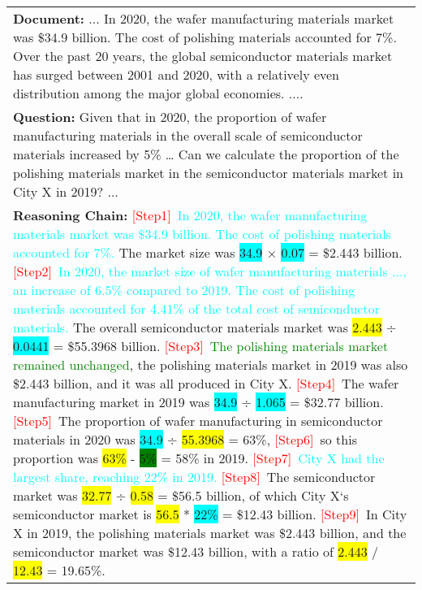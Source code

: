 \begin{table}[]
    \centering
    \begin{tabular}{p{7.5cm}}
    \toprule
    \textbf{Document:}
    \small ... In 2020, the wafer manufacturing materials market was \$34.9 billion. The cost of polishing materials accounted for 7\%. Over the past 20 years, the global semiconductor materials market has surged between 2001 and 2020, with a relatively even distribution among the major global economies. .... \\
    \textbf{Question:} \small Given that in 2020, the proportion of wafer manufacturing materials in the overall scale of semiconductor materials increased by 5\% … Can we
calculate the proportion of the polishing materials market in the semiconductor materials market in City X in 2019? ...\\
   \textbf{Reasoning Chain:} 
   \small \textcolor{red}{[Step1]~}\textcolor{cyan}{In 2020, the wafer manufacturing materials market was \$34.9 billion. The cost of polishing materials accounted for 7\%.}
   The market size was \colorbox{cyan}{34.9} × \colorbox{cyan}{0.07} = \$2.443 billion.
   \textcolor{red}{[Step2]~}\textcolor{cyan}{In 2020, the market size of wafer manufacturing materials ..., an increase of 6.5\% compared to 2019. The cost of polishing materials accounted for 4.41\% of the total cost of semiconductor materials.}
   The overall semiconductor materials market was \colorbox{yellow}{2.443} ÷ \colorbox{cyan}{0.0441} = \$55.3968 billion.
\textcolor{red}{[Step3]~}\textcolor{green}{The polishing materials market remained unchanged}, the polishing materials market in 2019 was also \$2.443 billion, and it was all produced in City X.
\textcolor{red}{[Step4]~}The wafer manufacturing market in 2019 was \colorbox{cyan}{34.9} ÷ \colorbox{cyan}{1.065} = \$32.77 billion.
\textcolor{red}{[Step5]~}The proportion of wafer manufacturing in semiconductor materials in 2020 was \colorbox{cyan}{34.9} ÷ \colorbox{yellow}{55.3968} = 63\%, \textcolor{red}{[Step6]~}so this proportion was \colorbox{yellow}{63\%} - \colorbox{green}{5\%} = 58\% in 2019.
\textcolor{red}{[Step7]~}\textcolor{cyan}{City X had the largest share, reaching 22\% in 2019.}
\textcolor{red}{[Step8]~}The semiconductor market was \colorbox{yellow}{32.77} ÷ \colorbox{yellow}{0.58} = \$56.5 billion, of which City X‘s semiconductor market is \colorbox{yellow}{56.5} * \colorbox{cyan}{22\%} = \$12.43 billion.
\textcolor{red}{[Step9]~}In City X in 2019, the polishing materials market was \$2.443 billion, and the semiconductor market was \$12.43 billion, with a ratio of \colorbox{yellow}{2.443} / \colorbox{yellow}{12.43} = 19.65\%.

\end{tabular}
\end{table}
